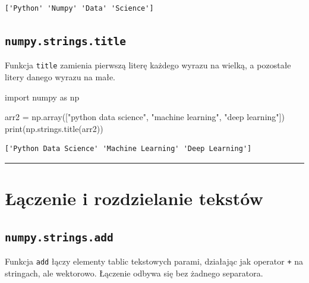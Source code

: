 \documentclass[
  polish,
  letterpaper,
  DIV=11,
  numbers=noendperiod]{scrreprt}
\newenvironment{Shaded}{\begin{snugshade}}{\end{snugshade}}
\newcommand{\BuiltInTok}[1]{\textcolor[rgb]{0.00,0.23,0.31}{#1}}
\newcommand{\ImportTok}[1]{\textcolor[rgb]{0.00,0.46,0.62}{#1}}
\newcommand{\NormalTok}[1]{\textcolor[rgb]{0.00,0.23,0.31}{#1}}
\newcommand{\OperatorTok}[1]{\textcolor[rgb]{0.37,0.37,0.37}{#1}}
\newcommand{\StringTok}[1]{\textcolor[rgb]{0.13,0.47,0.30}{#1}}
\begin{document}
\begin{verbatim}
['Python' 'Numpy' 'Data' 'Science']
\end{verbatim}

\subsection{\texorpdfstring{\texttt{numpy.strings.title}}{numpy.strings.title}}\label{numpy.strings.title}

Funkcja \texttt{title} zamienia pierwszą literę każdego wyrazu na
wielką, a pozostałe litery danego wyrazu na małe.

\begin{Shaded}
\begin{Highlighting}[]
\ImportTok{import}\NormalTok{ numpy }\ImportTok{as}\NormalTok{ np}

\NormalTok{arr2 }\OperatorTok{=}\NormalTok{ np.array([}\StringTok{"python data science"}\NormalTok{, }\StringTok{"machine learning"}\NormalTok{, }\StringTok{"deep learning"}\NormalTok{])}
\BuiltInTok{print}\NormalTok{(np.strings.title(arr2))}
\end{Highlighting}
\end{Shaded}

\begin{verbatim}
['Python Data Science' 'Machine Learning' 'Deep Learning']
\end{verbatim}

\begin{center}\rule{0.5\linewidth}{0.5pt}\end{center}

\section{Łączenie i rozdzielanie
tekstów}\label{ux142ux105czenie-i-rozdzielanie-tekstuxf3w}

\subsection{\texorpdfstring{\texttt{numpy.strings.add}}{numpy.strings.add}}\label{numpy.strings.add}

Funkcja \texttt{add} łączy elementy tablic tekstowych parami, działając
jak operator \texttt{+} na stringach, ale wektorowo. Łączenie odbywa się
bez żadnego separatora.
\end{document}
